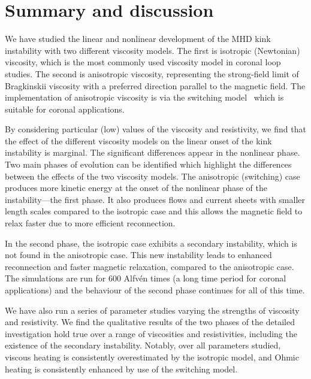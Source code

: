 \section{Summary and discussion}
\label{sec:conclusions}

We have studied the linear and nonlinear development of the MHD kink
instability with two different viscosity models. The first is
isotropic (Newtonian) viscosity, which is the most commonly used
viscosity model in coronal loop studies. The second is anisotropic viscosity, representing the strong-field limit of Bragkinskii viscosity with a preferred direction parallel to the magnetic field. The implementation of anisotropic viscosity is via the switching model~\cite{mactaggartBraginskiiMagnetohydrodynamicsArbitrary2017} which is suitable for coronal applications.

By considering particular (low) values of the viscosity and resistivity, we find that the effect of the different viscosity models on the linear onset of the kink instability is marginal. The significant differences appear in the nonlinear phase. Two main phases of evolution can be identified which highlight the differences between the effects of the two viscosity models. The anisotropic (switching) case produces more kinetic energy at the onset of the nonlinear phase of the instability---the first phase. It also produces flows and current sheets with smaller length scales compared to the isotropic case and this allows the magnetic field to relax faster due to more efficient reconnection. 

In the second phase, the isotropic case exhibits a secondary instability, which is not found in the anisotropic case. This new instability leads to enhanced reconnection and faster magnetic relaxation, compared to the anisotropic case.  The simulations are run for $600$ Alfv\'en times (a long time period for coronal applications) and the behaviour of the second phase continues for all of this time.

We have also run a series of parameter studies varying the strengths of viscosity and resistivity. We find the qualitative results of the two phases of the detailed investigation hold true over a range of viscosities and resistivities, including the existence of the secondary instability. Notably, over all parameters studied, viscous heating is consistently overestimated by the isotropic model, and Ohmic heating is consistently enhanced by use of the switching model.

